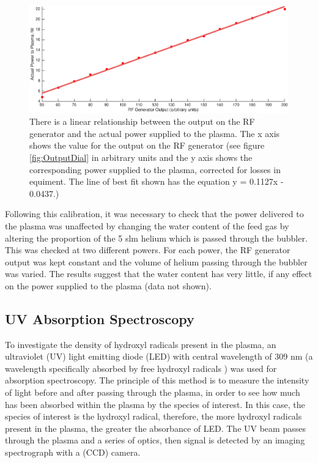 \documentclass[11pt, oneside]{article}   	%
\begin{document}
\begin{figure}
    \centering
    \includegraphics[width=\textwidth]{Figures/ActualPower.eps}
    \caption{There is a linear relationship between the output on the RF generator and the actual power supplied to the plasma. The x axis shows the value for the output on the RF generator (see figure \ref{fig:OutputDial} in arbitrary units and the y axis shows the corresponding power supplied to the plasma, corrected for losses in equiment. The line of best fit shown has the equation y = 0.1127x - 0.0437.)}
    \label{fig:SolaylPower}
\end{figure}

Following this calibration, it was necessary to check that the power delivered to the plasma was unaffected by changing the water content of the feed gas by altering the proportion of the 5 slm helium which is passed through the bubbler.
This was checked at two different powers. 
For each power, the RF generator output was kept constant and the volume of helium passing through the bubbler was varied.
The results suggest that the water content has very little, if any effect on the power supplied to the plasma (data not shown).


\subsection{UV Absorption Spectroscopy}
To investigate the density of hydroxyl radicals present in the plasma, an ultraviolet (UV) light emitting diode (LED) with central wavelength of 309 nm (a wavelength specifically absorbed by free hydroxyl radicals \cite{Hatano2010}) was used for absorption spectroscopy.
The principle of this method is to measure the intensity of light before and after passing through the plasma, in order to see how much has been absorbed within the plasma by the species of interest.
In this case, the species of interest is the hydroxyl radical, therefore, the more hydroxyl radicals present in the plasma, the greater the absorbance of LED.
The UV beam passes through the plasma and a series of optics, then signal is detected by an imaging spectrograph with a (CCD) camera.
\end{document}
